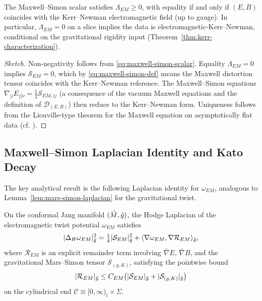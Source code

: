 \begin{lemma}\label{lem:ms-nonneg}
The Maxwell--Simon scalar satisfies $\Lambda_{EM}\geq 0$, with equality if and only if $(E, B)$ coincides with the Kerr--Newman electromagnetic field (up to gauge). In particular, $\Lambda_{EM}=0$ on a slice implies the data is electromagnetic-Kerr--Newman, conditional on the gravitational rigidity input (Theorem~\ref{thm:kerr-characterization}).
\end{lemma}

\begin{proof}[Sketch]
Non-negativity follows from \eqref{eq:maxwell-simon-scalar}. Equality $\Lambda_{EM}=0$ implies $\mathcal{S}_{EM}=0$, which by \eqref{eq:maxwell-simon-def} means the Maxwell distortion tensor coincides with the Kerr--Newman reference. The Maxwell--Simon equations $\nabla_{[i}E_{j]\nu} = \tfrac{1}{2}\mathcal{S}_{EM,ij}$ (a consequence of the vacuum Maxwell equations and the definition of $\mathcal{D}_{(E,B)}$) then reduce to the Kerr--Newman form. Uniqueness follows from the Liouville-type theorem for the Maxwell equation on asymptotically flat data (cf. \cite{chruscielcosta2008,ChruscielCostaHeusler2012}).
\end{proof}

\subsection{Maxwell--Simon Laplacian Identity and Kato Decay}

The key analytical result is the following Laplacian identity for $\omega_{EM}$, analogous to Lemma~\ref{lem:mars-simon-laplacian} for the gravitational twist.

\begin{lemma}\label{lem:ms-laplacian}
On the conformal Jang manifold $(\tilde{M}, \tilde{g})$, the Hodge Laplacian of the electromagnetic twist potential $\omega_{EM}$ satisfies
\begin{equation}\label{eq:ms-laplacian-em}
|\Delta_H \omega_{EM}|_{\tilde{g}}^2 = \tfrac{1}{4}|\mathcal{S}_{EM}|_{\tilde{g}}^2 + \langle \nabla \omega_{EM}, \nabla \mathcal{R}_{EM}\rangle_{\tilde{g}},
\end{equation}
where $\mathcal{R}_{EM}$ is an explicit remainder term involving $\bar\nabla E$, $\bar\nabla B$, and the gravitational Mars--Simon tensor $\mathcal{S}_{(g,K)}$, satisfying the pointwise bound
\begin{equation}\label{eq:rem-bound}
|\mathcal{R}_{EM}|_{\tilde{g}} \leq C_{EM}\bigl(|\mathcal{S}_{EM}|_{\tilde{g}} + |\mathcal{S}_{(g,K)}|_{\tilde{g}}\bigr)
\end{equation}
on the cylindrical end $\mathcal{C}\cong[0,\infty)_t\times\Sigma$.
\end{lemma}

